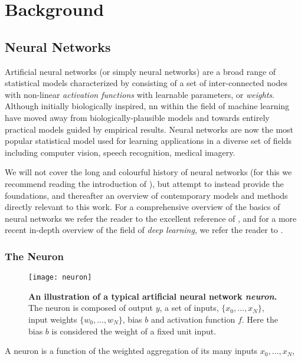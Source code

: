 \documentclass[thesis]{subfiles}
\begin{document}
\chapter{Background}
\label{background}
\section{Neural Networks}
Artificial neural networks (or simply neural networks) are a broad range of statistical models characterized by consisting of a set of inter-connected nodes with non-linear \emph{activation functions} with learnable parameters, or \emph{weights}.
 Although initially biologically inspired, \gls{nn} within the field of machine learning have moved away from biologically-plausible models and towards entirely practical models guided by empirical results. Neural networks are now the most popular statistical model used for learning applications in a diverse set of fields including computer vision, speech recognition, medical imagery. 

We will not cover the long and colourful history of neural networks (for this we recommend reading the introduction of \citet{goodfellow2016deep}), but attempt to instead provide the foundations, and thereafter an overview of contemporary models and methods directly relevant to this work. For a comprehensive overview of the basics of neural networks we refer the reader to the excellent reference of \citet{Bishop1995}, and for a more recent  in-depth overview of the field of \emph{deep learning}, we refer the reader to \citet{goodfellow2016deep}. 

\subsection{The Neuron}

\begin{figure}[tbp]
\centering
\texttt{[image: neuron]}
\caption[An illustration of a typical artificial neural network neuron.]{\textbf{An illustration of a typical artificial neural network \emph{neuron}.} The neuron is composed of output $y$, a set of inputs, $\{x_0, \ldots, x_N\}$, input weights $\{w_0, \ldots, w_N\}$, bias $b$ and activation function $f$. Here the bias $b$ is considered the weight of a fixed unit input.}
\label{fig:neuron}
\end{figure}
A neuron is a function of the weighted aggregation of its many inputs ${x_0,\ldots,x_N}$,
\end{document}
